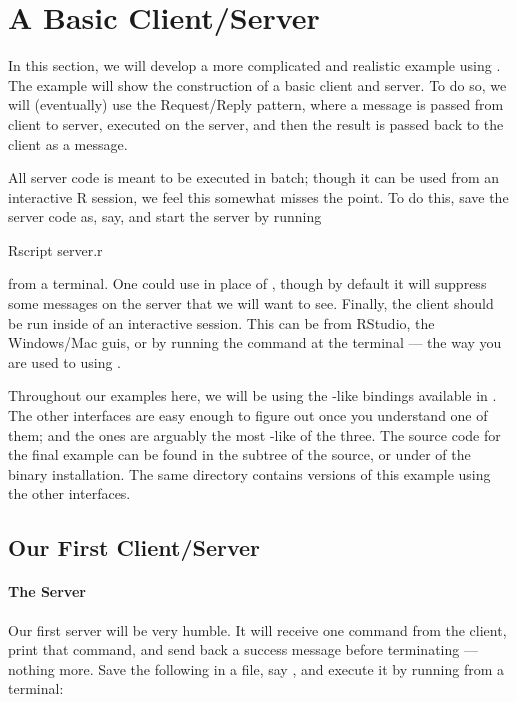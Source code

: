 \section[A Basic Client/Server]{A Basic Client/Server}
\label{sec:backward}


In this section, we will develop a more complicated and realistic example using
.  The example will show the construction of a basic client and
server.  To do so, we will (eventually) use the Request/Reply pattern, where a
message is passed from client to server, executed on the server, and then the
result is passed back to the client as a message.

All server code is meant to be executed in
batch; though it can be used from an interactive R session, we feel this
somewhat misses the point.  To do this, save the server code as, say,
 and start the server by running
\begin{Command}
Rscript server.r
\end{Command}
from a terminal.  One could use  in place of , 
though by default it will suppress some messages on the server that we will 
want to see.  Finally, the client should be run inside of an interactive
 session.  This can be from RStudio, the Windows/Mac 
guis, or by running the command  at the terminal --- the way you are
used to using .

Throughout our examples here, we will be using the -like bindings 
available in .  The other interfaces are easy enough to figure out
once you understand one of them; and the  ones are arguably the most
-like of the three.
The source code for the final example can be found in the 
 subtree of the  source, or under
 of the binary installation.  The same directory
contains versions of this example using the other  interfaces.


\subsection{Our First Client/Server}

\paragraph{The Server}
Our first server will be very humble.  It will receive one command from the
client, print that command, and send back a success message before terminating
--- nothing  more.  Save the following in a file, say , and
execute it by running  from a terminal:


